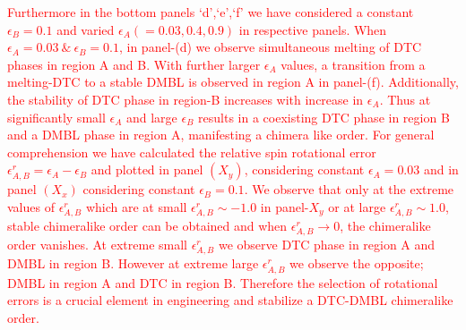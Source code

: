 \documentclass[12pt]{iopart}
\newcommand{\red}[1]{\textcolor{red}{#1}}
\begin{document}
\red{Furthermore in the bottom panels `d',`e',`f' we have considered a constant $\epsilon_{B} = 0.1$ and varied $\epsilon_{A}(=0.03,0.4,0.9)$ in respective panels. When $\epsilon_{A}=0.03~\&~ \epsilon_{B}=0.1$, in panel-(d) we observe simultaneous melting of DTC phases in region A and B. With further larger $\epsilon_{A}$ values, a transition from a melting-DTC to a stable DMBL is observed in region A in panel-(f). Additionally, the stability of DTC phase in region-B increases with increase in $\epsilon_{A}$. Thus at significantly small $\epsilon_{A}$ and large $\epsilon_{B}$ results in a coexisting DTC phase in region B and a DMBL phase in region A, manifesting a chimera like order. For general comprehension we have calculated the relative spin rotational error $\epsilon^r_{A,B} = \epsilon_{A}-\epsilon_{B}$ and plotted in panel $(X_y)$, considering constant $\epsilon_{A} = 0.03$ and in panel $(X_x)$ considering constant $\epsilon_{B} = 0.1$. We observe that only at the extreme values of $\epsilon^r_{A,B}$ which are at small $\epsilon^r_{A,B} \sim -1.0$ in panel-$X_y$ or at large $\epsilon^r_{A,B} \sim 1.0$, stable chimeralike order can be obtained and when $\epsilon^r_{A,B}\rightarrow 0$, the chimeralike order vanishes. At extreme small $\epsilon^r_{A,B}$ we observe DTC phase in region A and DMBL in region B. However at extreme large $\epsilon^r_{A,B}$ we observe the opposite; DMBL in region A and DTC in region B. Therefore the selection of rotational errors is a crucial element in engineering and stabilize a DTC-DMBL chimeralike order.} 
\end{document}

